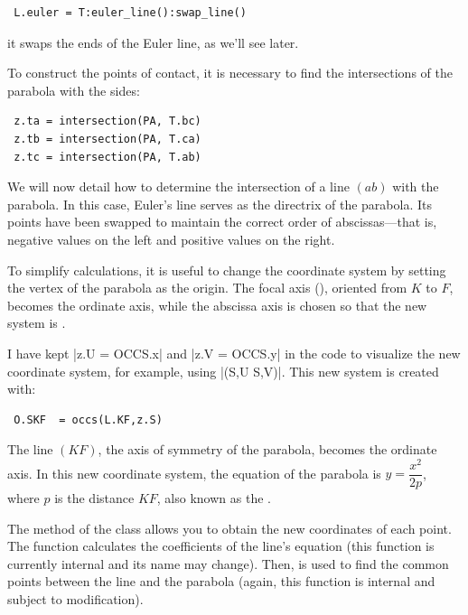 \begin{mybox}
\begin{verbatim}
 L.euler = T:euler_line():swap_line()
\end{verbatim}
\end{mybox}

it swaps the ends of the Euler line, as we'll see later.

 To construct the points of contact, it is necessary to find the intersections of the parabola with the sides:

\begin{mybox}
\begin{verbatim}
 z.ta = intersection(PA, T.bc)
 z.tb = intersection(PA, T.ca)
 z.tc = intersection(PA, T.ab)
\end{verbatim}
\end{mybox}

We will now detail how to determine the intersection of a line $(ab)$ with the parabola. In this case, Euler's line serves as the directrix of the parabola. Its points have been swapped to maintain the correct order of abscissas—that is, negative values on the left and positive values on the right.

To simplify calculations, it is useful to change the coordinate system by setting the vertex of the parabola as the origin. The focal axis (), oriented from $K$ to $F$, becomes the ordinate axis, while the abscissa axis is chosen so that the new system is .

I have kept |z.U = OCCS.x| and |z.V = OCCS.y| in the code to visualize the new coordinate system, for example, using |\tkzDrawSegments[red,->](S,U S,V)|. This new system is created with:

\begin{mybox}
\begin{verbatim}
 O.SKF  = occs(L.KF,z.S)
\end{verbatim}
\end{mybox}

The line $(KF)$, the axis of symmetry of the parabola, becomes the ordinate axis. In this new coordinate system, the equation of the parabola is $y = \dfrac{x^2}{2p}$, where $p$ is the distance $KF$, also known as the .

The  method of the  class allows you to obtain the new coordinates of each point. The  function calculates the coefficients of the line's equation (this function is currently internal and its name may change). Then,  is used to find the common points between the line and the parabola (again, this function is internal and subject to modification).

